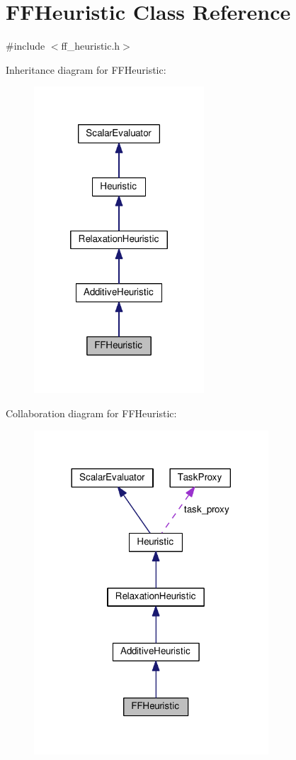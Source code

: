 \hypertarget{classFFHeuristic}{\section{F\-F\-Heuristic Class Reference}
\label{classFFHeuristic}
}


{\ttfamily \#include $<$ff\-\_\-heuristic.\-h$>$}



Inheritance diagram for F\-F\-Heuristic\-:
\nopagebreak
\begin{figure}[H]
\begin{center}
\leavevmode
\includegraphics[width=180pt]{classFFHeuristic__inherit__graph}
\end{center}
\end{figure}


Collaboration diagram for F\-F\-Heuristic\-:
\nopagebreak
\begin{figure}[H]
\begin{center}
\leavevmode
\includegraphics[width=248pt]{classFFHeuristic__coll__graph}
\end{center}
\end{figure}
